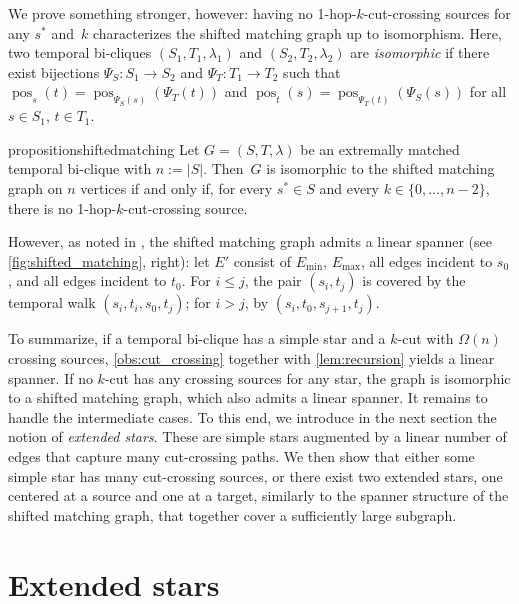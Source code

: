\documentclass[11pt, letterpaper]{article}
\DeclareMathOperator{\pos}{pos}
\newcommand{\minedges}{E_{\mathrm{min}}}
\newcommand{\maxedges}{E_{\mathrm{max}}}
\theoremstyle{definition}
\theoremstyle{plain}
\begin{document}
We prove something stronger, however: having no 1-hop-$k$-cut-crossing sources for any $s^*$ and~$k$ characterizes the shifted matching graph up to isomorphism. Here, two temporal bi-cliques $(S_1,T_1,\lambda_1)$ and $(S_2,T_2,\lambda_2)$ are \emph{isomorphic} if there exist bijections $\Psi_S \colon S_1 \to S_2$ and $\Psi_T\colon T_1 \to T_2$ such that $\pos_{s}(t)=\pos_{\Psi_S(s)}(\Psi_T(t))$ and $\pos_{t}(s)=\pos_{\Psi_T(t)}(\Psi_S(s))$ for all $s\in S_1$, $t\in T_1$.


\begin{restatable}{proposition}{shiftedmatching}
Let $G=(S,T,\lambda)$ be an extremally matched temporal bi-clique with $n:=|S|$. Then~$G$ is isomorphic to the shifted matching graph on $n$ vertices if and only if, for every $s^*\in S$ and every $k\in\{0,\dots,n-2\}$, there is no 1-hop-$k$-cut-crossing source.
\end{restatable}


However, as noted in \cite{Angrick24}, the shifted matching graph admits a linear spanner (see \cref{fig:shifted_matching}, right): let $E'$ consist of $\minedges$, $\maxedges$, all edges incident to $s_0$, and all edges incident to $t_0$. For $i\leq j$, the pair $(s_i,t_j)$ is covered by the temporal walk $(s_i,t_i,s_0,t_j)$; for $i > j$, by $(s_i,t_0,s_{j+1},t_j)$.

To summarize, if a temporal bi-clique has a simple star and a $k$-cut with $\Omega(n)$ crossing sources, \cref{obs:cut_crossing} together with \cref{lem:recursion} yields a linear spanner. If no $k$-cut has any crossing sources for any star, the graph is isomorphic to a shifted matching graph, which also admits a linear spanner. It remains to handle the intermediate cases.
To this end, we introduce in the next section the notion of \emph{extended stars}. These are simple stars augmented by a linear number of edges that capture many cut-crossing paths. We then show that either some simple star has many cut-crossing sources, or there exist two extended stars, one centered at a source and one at a target, similarly to the spanner structure of the shifted matching graph, that together cover a sufficiently large subgraph.





\section{Extended stars}
\label{sec:extended_stars}
\end{document}
